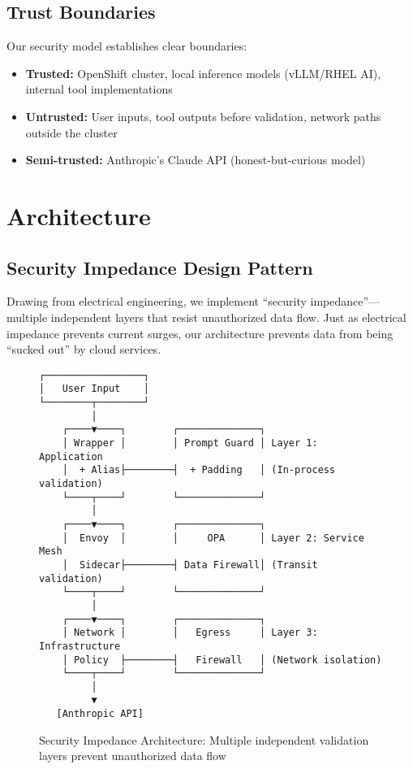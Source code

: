 \documentclass[11pt]{article}
\begin{document}
\subsection{Trust Boundaries}

Our security model establishes clear boundaries:
\begin{itemize}
\item \textbf{Trusted:} OpenShift cluster, local inference models (vLLM/RHEL AI), internal tool implementations
\item \textbf{Untrusted:} User inputs, tool outputs before validation, network paths outside the cluster
\item \textbf{Semi-trusted:} Anthropic's Claude API (honest-but-curious model)
\end{itemize}

\section{Architecture}

\subsection{Security Impedance Design Pattern}

Drawing from electrical engineering, we implement ``security impedance''—multiple independent layers that resist unauthorized data flow. Just as electrical impedance prevents current surges, our architecture prevents data from being ``sucked out'' by cloud services.

\begin{figure}[htbp]
\centering
\begin{verbatim}
┌─────────────────┐
│   User Input    │
└────────┬────────┘
         │
    ┌────▼────┐        ┌──────────────┐
    │ Wrapper │        │ Prompt Guard │ Layer 1: Application
    │  + Alias├────────┤  + Padding   │ (In-process validation)
    └────┬────┘        └──────────────┘
         │
    ┌────▼────┐        ┌──────────────┐
    │  Envoy  │        │     OPA      │ Layer 2: Service Mesh
    │  Sidecar├────────┤ Data Firewall│ (Transit validation)
    └────┬────┘        └──────────────┘
         │
    ┌────▼────┐        ┌──────────────┐
    │ Network │        │   Egress     │ Layer 3: Infrastructure
    │ Policy  ├────────┤   Firewall   │ (Network isolation)
    └────┬────┘        └──────────────┘
         │
         ▼
   [Anthropic API]
\end{verbatim}
\caption{Security Impedance Architecture: Multiple independent validation layers prevent unauthorized data flow}
\label{fig:impedance}
\end{figure}
\end{document}
